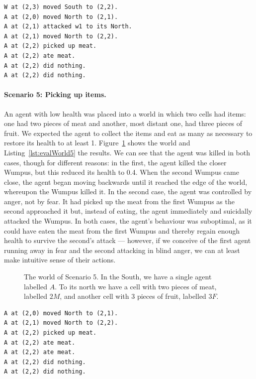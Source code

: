 \begin{lstlisting}[caption=Actions in Scenario 4., label=lst:evalWorld4, float=t]
W at (2,3) moved South to (2,2).
A at (2,0) moved North to (2,1).
A at (2,1) attacked w1 to its North.
A at (2,1) moved North to (2,2).
A at (2,2) picked up meat.
A at (2,2) ate meat.
A at (2,2) did nothing.
A at (2,2) did nothing.
\end{lstlisting}

\paragraph{Scenario 5: Picking up items.} An agent with low health was placed into a world in which two cells had items: one had two pieces of meat and another, most distant one, had three pieces of fruit. We expected the agent to collect the items and eat as many as necessary to restore its health to at least 1. Figure~\ref{fig:evalWorld5} shows the world and Listing~\ref{lst:evalWorld5} the results. We can see that the agent was killed in both cases, though for different reasons: in the first, the agent killed the closer Wumpus, but this reduced its health to 0.4. When the second Wumpus came close, the agent began moving backwards until it reached the edge of the world, whereupon the Wumpus killed it. In the second case, the agent was controlled by anger, not by fear. It had picked up the meat from the first Wumpus as the second approached it but, instead of eating, the agent immediately and suicidally attacked the Wumpus. In both cases, the agent's behaviour was suboptimal, as it could have eaten the meat from the first Wumpus and thereby regain enough health to survive the second's attack --- however, if we conceive of the first agent running away in fear and the second attacking in blind anger, we can at least make intuitive sense of their actions.

\begin{figure}[t]
	\centering
	
	\caption{The world of Scenario 5. In the South, we have a single agent labelled $A$. To its north we have a cell with two pieces of meat, labelled $2M$, and another cell with 3 pieces of fruit, labelled $3F$.}
	\label{fig:evalWorld5}
\end{figure}

\begin{lstlisting}[caption=Actions in Scenario 5., label=lst:evalWorld5, float=t]
A at (2,0) moved North to (2,1).
A at (2,1) moved North to (2,2).
A at (2,2) picked up meat.
A at (2,2) ate meat.
A at (2,2) ate meat.
A at (2,2) did nothing.
A at (2,2) did nothing.
\end{lstlisting}

